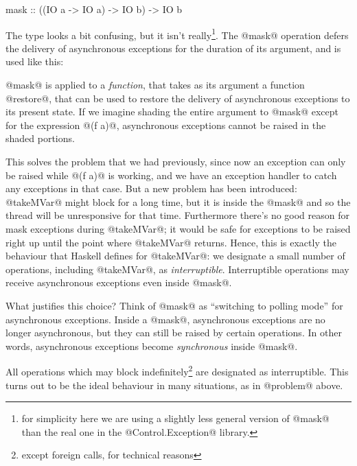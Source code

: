 \begin{haskell}
mask :: ((IO a -> IO a) -> IO b) -> IO b
\end{haskell}

\noindent The type looks a bit confusing, but it isn't
really\footnote{for simplicity here we are using a slightly less
  general version of @mask@ than the real one in the
  @Control.Exception@ library.}.  The @mask@ operation defers the
delivery of asynchronous exceptions for the duration of its argument,
and is used like this:


\noindent @mask@ is applied to a \emph{function}, that takes as its
argument a function @restore@, that can be used to restore the
delivery of asynchronous exceptions to its present state.  If we
imagine shading the entire argument to @mask@ except for the
expression @(f a)@, asynchronous exceptions cannot be raised in the
shaded portions.

This solves the problem that we had previously, since now an exception
can only be raised while @(f a)@ is working, and we have an exception
handler to catch any exceptions in that case.  But a new problem has
been introduced: @takeMVar@ might block for a long time, but it is
inside the @mask@ and so the thread will be unresponsive for that
time.  Furthermore there's no good reason for mask exceptions during
@takeMVar@; it would be safe for exceptions to be raised right up
until the point where @takeMVar@ returns.  Hence, this is exactly the
behaviour that Haskell defines for @takeMVar@: we designate a small
number of operations, including @takeMVar@, as \emph{interruptible}.
Interruptible operations may receive asynchronous exceptions even
inside @mask@.

What justifies this choice?  Think of @mask@ as ``switching to polling
mode'' for asynchronous exceptions.  Inside a @mask@, asynchronous
exceptions are no longer asynchronous, but they can still be raised by
certain operations.  In other words, asynchronous exceptions become
\emph{synchronous} inside @mask@.

All operations which may block indefinitely\footnote{except foreign
  calls, for technical reasons} are designated as interruptible.  This
turns out to be the ideal behaviour in many situations, as in
@problem@ above.

